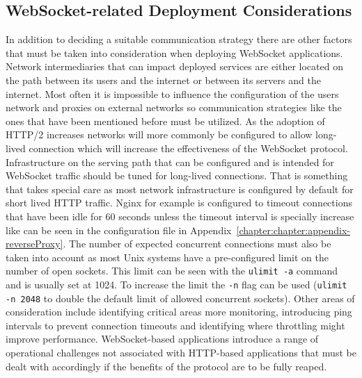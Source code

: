 \subsection{WebSocket-related Deployment Considerations}

In addition to deciding a suitable communication strategy there are other factors that must be taken into consideration when deploying WebSocket applications. Network intermediaries that can impact deployed services are either located on the path between its users and the internet or between its servers and the internet. Most often it is impossible to influence the configuration of the users network and proxies on external networks so communication strategies like the ones that have been mentioned before must be utilized. As the adoption of HTTP/2 increases networks will more commonly be configured to allow long-lived connection which will increase the effectiveness of the WebSocket protocol. Infrastructure on the serving path that can be configured and is intended for WebSocket traffic should be tuned for long-lived connections. That is something that takes special care as most network infrastructure is configured by default for short lived HTTP traffic. Nginx for example is configured to timeout connections that have been idle for 60 seconds unless the timeout interval is specially increase like can be seen in the configuration file in Appendix~\ref{chapter:chapter:appendix-reverseProxy}. The number of expected concurrent connections must also be taken into account as most Unix systems have a pre-configured limit on the number of open sockets. This limit can be seen with the \texttt{ulimit -a} command and is usually set at 1024. To increase the limit the \texttt{-n} flag can be used (\texttt{ulimit -n 2048} to double the default limit of allowed concurrent sockets). Other areas of consideration include identifying critical areas more monitoring, introducing ping intervals to prevent connection timeouts and identifying where throttling might improve performance. WebSocket-based applications introduce a range of operational challenges not associated with HTTP-based applications that must be dealt with accordingly if the benefits of the protocol are to be fully reaped.